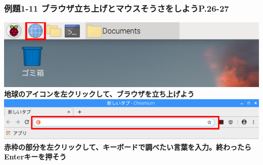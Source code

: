 \documentclass[dvipdfmx]{beamer}
\begin{document}
\begin{frame}[fragile]
	\frametitle{\large{例題1-11 ブラウザ立ち上げとマウスそうさをしようP.26-27}~~~}
  \includegraphics[width=\textwidth]{slide02_009.png}
  \vfill  
  \large\textbf{地球のアイコンを左クリックして、ブラウザを立ち上げよう}
  \vfill
  \includegraphics[width=\textwidth]{slide02_005.png}
  \vfill
  \large\textbf{赤枠の部分を左クリックして、キーボードで調べたい言葉を入力。終わったらEnterキーを押そう}\\
\end{frame}
\end{document}
